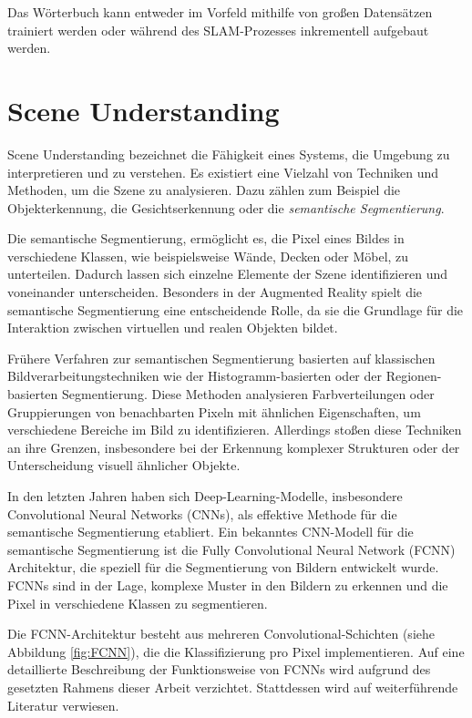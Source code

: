 Das Wörterbuch kann entweder im Vorfeld mithilfe von großen Datensätzen trainiert werden oder während des SLAM-Prozesses inkrementell aufgebaut werden. \cite{ta2023loopClosure, khan2015ibuild, gao2021vSLAM}

\section{Scene Understanding} \label{sec:SceneUnderstanding}

Scene Understanding bezeichnet die Fähigkeit eines Systems, die Umgebung zu interpretieren und zu verstehen. Es existiert eine Vielzahl von Techniken und Methoden, um die Szene zu analysieren. Dazu zählen zum Beispiel die Objekterkennung, die Gesichtserkennung oder die \emph{semantische Segmentierung}. \cite{szeliski2022computerVision}

Die semantische Segmentierung, ermöglicht es, die Pixel eines Bildes in verschiedene Klassen, wie beispielsweise Wände, Decken oder Möbel, zu unterteilen. Dadurch lassen sich einzelne Elemente der Szene identifizieren und voneinander unterscheiden. Besonders in der Augmented Reality spielt die semantische Segmentierung eine entscheidende Rolle, da sie die Grundlage für die Interaktion zwischen virtuellen und realen Objekten bildet. \cite{szeliski2022computerVision, appledevdoc, arcoredevdoc}

Frühere Verfahren zur semantischen Segmentierung basierten auf klassischen Bildverarbeitungstechniken wie der Histogramm-basierten oder der Regionen-basierten Segmentierung. Diese Methoden analysieren Farbverteilungen oder Gruppierungen von benachbarten Pixeln mit ähnlichen Eigenschaften, um verschiedene Bereiche im Bild zu identifizieren. Allerdings stoßen diese Techniken an ihre Grenzen, insbesondere bei der Erkennung komplexer Strukturen oder der Unterscheidung visuell ähnlicher Objekte. \cite{szeliski2022computerVision}

In den letzten Jahren haben sich Deep-Learning-Modelle, insbesondere Convolutional Neural Networks (CNNs), als effektive Methode für die semantische Segmentierung etabliert. Ein bekanntes CNN-Modell für die semantische Segmentierung ist die Fully Convolutional Neural Network (FCNN) Architektur, die speziell für die Segmentierung von Bildern entwickelt wurde. FCNNs sind in der Lage, komplexe Muster in den Bildern zu erkennen und die Pixel in verschiedene Klassen zu segmentieren. \cite{long2014fcnn}

Die FCNN-Architektur besteht aus mehreren Convolutional-Schichten (siehe Abbildung \ref{fig:FCNN}), die die Klassifizierung pro Pixel implementieren. Auf eine detaillierte Beschreibung der Funktionsweise von FCNNs wird aufgrund des gesetzten Rahmens dieser Arbeit verzichtet. Stattdessen wird auf weiterführende Literatur verwiesen. \cite{long2014fcnn, ronneberger2015unet}

